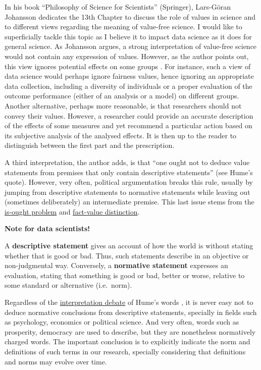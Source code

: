 \documentclass[
]{book}
\begin{document}
In his book ``Philosophy of Science for Scientists'' (Springer), Lars-Göran Johansson dedicates the 13th Chapter to discuss the role of values in science and to different views regarding the meaning of value-free science. I would like to superficially tackle this topic as I believe it to impact data science as it does for general science. As Johansson argues, a strong interpretation of value-free science would not contain any expression of values. However, as the author points out, this view ignores potential effects on some groups \citep{johansson2016philosophy}. For instance, such a view of data science would perhaps ignore fairness values, hence ignoring an appropriate data collection, including a diversity of individuals or a proper evaluation of the outcome performance (either of an analysis or a model) on different groups. Another alternative, perhaps more reasonable, is that researchers should not convey their values. However, a researcher could provide an accurate description of the effects of some measures and yet recommend a particular action based on its subjective analysis of the analysed effects. It is then up to the reader to distinguish between the first part and the prescription.

A third interpretation, the author adds, is that ``one ought not to deduce value statements from premises that only contain descriptive statements'' (see Hume's quote). However, very often, political argumentation breaks this rule, usually by jumping from descriptive statements to normative statements while leaving out (sometimes deliberately) an intermediate premise. This last issue stems from the \href{https://en.wikipedia.org/wiki/Is\%E2\%80\%93ought_problem}{is-ought problem} and \href{https://en.wikipedia.org/wiki/Fact\%E2\%80\%93value_distinction}{fact-value distinction}.

\begin{tipbox}

\textbf{Note for data scientists!}

A \textbf{descriptive statement} gives an account of how the world is without stating whether that is good or bad. Thus, such statements describe in an objective or non-judgmental way. Conversely, a \textbf{normative statement} expresses an evaluation, stating that something is good or bad, better or worse, relative to some standard or alternative (i.e.~norm).

\end{tipbox}

Regardless of the \href{https://plato.stanford.edu/entries/hume-moral/\#io}{interpretation debate} of Hume's words \citep{sep-hume-moral}, it is never easy not to deduce normative conclusions from descriptive statements, specially in fields such as psychology, economics or political science. And very often, words such as prosperity, democracy are used to describe, but they are nonetheless normatively charged words. The important conclusion is to explicitly indicate the norm and definitions of such terms in our research, specially considering that definitions and norms may evolve over time.
\end{document}
